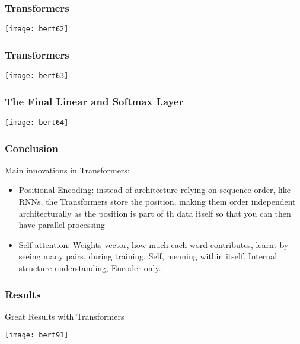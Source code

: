 \begin{frame}[fragile]\frametitle{Transformers}


			\begin{center}
			\texttt{[image: bert62]}
			\end{center}		

			
\end{frame}

\begin{frame}[fragile]\frametitle{Transformers}


			\begin{center}
			\texttt{[image: bert63]}
			\end{center}		

			
\end{frame}

\begin{frame}[fragile]\frametitle{The Final Linear and Softmax Layer}


			\begin{center}
			\texttt{[image: bert64]}
			\end{center}		

			
\end{frame}

\begin{frame}[fragile]\frametitle{Conclusion}

Main innovations in Transformers:
\begin{itemize}
\item Positional Encoding: instead of architecture relying on sequence order, like RNNs, the Transformers store the position, making them order independent architecturally as the position is part of th data itself so that you can then have parallel processing
\item Self-attention: Weights vector, how much each word contributes, learnt by seeing many pairs, during training. Self, meaning within itself. Internal structure understanding, Encoder only.

			\end{itemize}
			
\end{frame}


\begin{frame}[fragile]\frametitle{Results}
Great Results with Transformers
			
			\begin{center}
			\texttt{[image: bert91]}
			\end{center}		
			

\end{frame}

